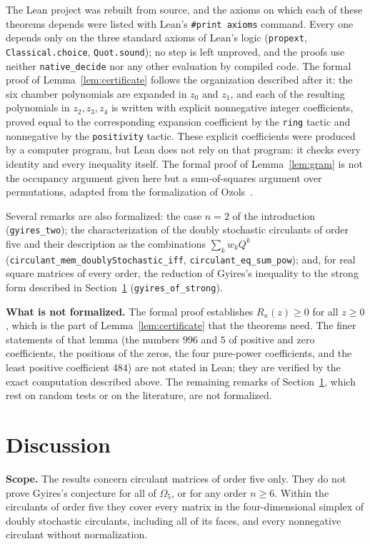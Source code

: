 \documentclass[11pt,a4paper]{article}
\theoremstyle{definition}
\theoremstyle{remark}
\newcommand{\para}[1]{\par\medskip\noindent\textbf{#1}\enspace}
\newcommand{\lean}[1]{\texttt{#1}}
\begin{document}
The Lean project was rebuilt from source, and the axioms on which each of these theorems depends were listed with
Lean's \texttt{\#print axioms} command. Every one depends only on the three standard axioms of Lean's logic
(\texttt{propext}, \texttt{Classical.choice}, \texttt{Quot.sound}); no step is left unproved, and the proofs use neither
\texttt{native\_decide} nor any other evaluation by compiled code. The formal proof of Lemma~\ref{lem:certificate}
follows the organization described after it: the six chamber polynomials are expanded in $z_0$ and $z_1$, and each of
the resulting polynomials in $z_2,z_3,z_4$ is written with explicit nonnegative integer coefficients, proved equal to the
corresponding expansion coefficient by the \texttt{ring} tactic and nonnegative by the \texttt{positivity} tactic. These explicit
coefficients were produced by a computer program, but Lean does not rely on that program: it checks every identity and
every inequality itself. The formal proof of Lemma~\ref{lem:gram} is not the occupancy argument given here but a
sum-of-squares argument over permutations, adapted from the formalization of Ozols~\cite{ozols}.

Several remarks are also formalized: the case $n=2$ of the introduction (\lean{gyires\_two}); the characterization of
the doubly stochastic circulants of order five and their description as the combinations $\sum_kw_kQ^k$
(\lean{circulant\_mem\_doublyStochastic\_iff}, \lean{circulant\_eq\_sum\_pow}); and, for real square matrices of
every order, the reduction of Gyires's inequality to the strong form described in Section~\ref{sec:discussion}
(\lean{gyires\_of\_strong}).

\para{What is not formalized.}
The formal proof establishes $R_\kappa(z)\ge0$ for all $z\ge0$, which is the part of Lemma~\ref{lem:certificate} that
the theorems need. The finer statements of that lemma (the numbers $996$ and $5$ of positive and zero coefficients,
the positions of the zeros, the four pure-power coefficients, and the least positive coefficient $484$) are not stated
in Lean; they are verified by the exact computation described above. The remaining remarks of
Section~\ref{sec:discussion}, which rest on random tests or on the literature, are not formalized.

\section{Discussion}\label{sec:discussion}

\para{Scope.} The results concern circulant matrices of order five only. They do not prove Gyires's conjecture for all of
$\Omega_5$, or for any order $n\ge6$. Within the circulants of order five they cover every matrix in the
four-dimensional simplex of doubly stochastic circulants, including all of its faces, and every nonnegative circulant
without normalization.
\end{document}
